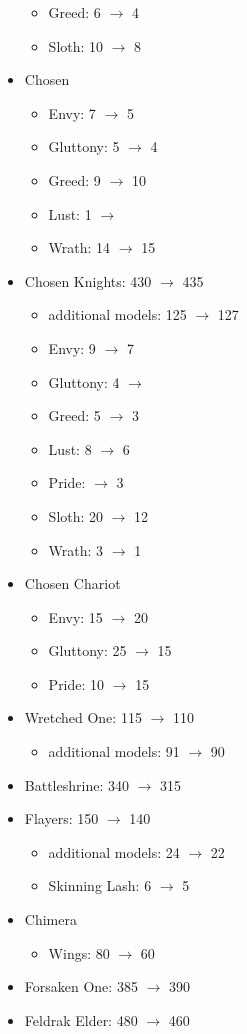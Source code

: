 \begin{itemize}
\begin{itemize}
\item Greed: 6 $\rightarrow$ 4
\item Sloth: 10 $\rightarrow$ 8
\end{itemize}
\item Chosen
\begin{itemize}
\item Envy: 7 $\rightarrow$ 5
\item Gluttony: 5 $\rightarrow$ 4
\item Greed: 9 $\rightarrow$ 10
\item Lust: 1 $\rightarrow$ \free
\item Wrath: 14 $\rightarrow$ 15
\end{itemize}
\end{itemize}
\newpage
\begin{itemize}
\item Chosen Knights: 430 $\rightarrow$ 435
\begin{itemize}
\item additional models: 125 $\rightarrow$ 127
\item Envy: 9 $\rightarrow$ 7
\item Gluttony: 4 $\rightarrow$ \free
\item Greed: 5 $\rightarrow$ 3
\item Lust: 8 $\rightarrow$ 6
\item Pride: \free{} $\rightarrow$ 3
\item Sloth: 20 $\rightarrow$ 12
\item Wrath: 3 $\rightarrow$ 1
\end{itemize}
\item Chosen Chariot
\begin{itemize}
\item Envy: 15 $\rightarrow$ 20
\item Gluttony: 25 $\rightarrow$ 15
\item Pride: 10 $\rightarrow$ 15
\end{itemize}
\item Wretched One: 115 $\rightarrow$ 110
\begin{itemize}
\item additional models: 91 $\rightarrow$ 90
\end{itemize}
\item Battleshrine: 340 $\rightarrow$ 315
\item Flayers: 150 $\rightarrow$ 140
\begin{itemize}
\item additional models: 24 $\rightarrow$ 22
\item Skinning Lash: 6 $\rightarrow$ 5
\end{itemize}
\item Chimera
\begin{itemize}
\item Wings: 80 $\rightarrow$ 60
\end{itemize}
\item Forsaken One: 385 $\rightarrow$ 390
\item Feldrak Elder: 480 $\rightarrow$ 460
\end{itemize}

